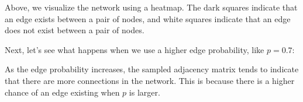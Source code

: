 \documentclass[letterpaper,10pt,english]{jupyterBook}
\begin{document}
\noindent{}

\sphinxAtStartPar
Above, we visualize the network using a heatmap. The dark squares indicate that an edge exists between a pair of nodes, and white squares indicate that an edge does not exist between a pair of nodes.

\sphinxAtStartPar
Next, let’s see what happens when we use a higher edge probability, like \(p=0.7\):

\begin{sphinxVerbatim}[commandchars=\\\{\}]
    

     

   
\end{sphinxVerbatim}

\noindent{}

\sphinxAtStartPar
As the edge probability increases, the sampled adjacency matrix tends to indicate that there are more connections in the network. This is because there is a higher chance of an edge existing when \(p\) is larger.
\end{document}
